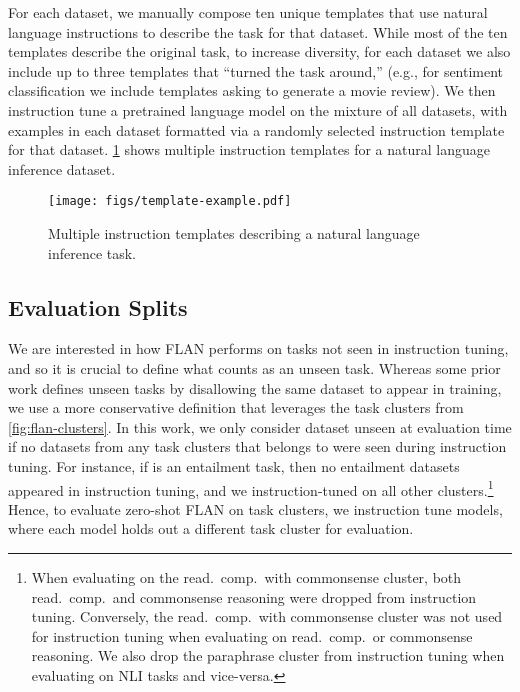 \documentclass{article} \usepackage{iclr2022_conference,times}
\newcommand{\flan}{FLAN}
\begin{document}
For each dataset, we manually compose ten unique templates that use natural language instructions to describe the task for that dataset.
While most of the ten templates describe the original task, to increase diversity, for each dataset we also include up to three templates that ``turned the task around,'' (e.g., for sentiment classification we include templates asking to generate a movie review).
We then instruction tune a pretrained language model on the mixture of all datasets, with examples in each dataset formatted via a randomly selected instruction template for that dataset.
\cref{fig:flan-template-example} shows multiple instruction templates for a natural language inference dataset.
\vspace{-1mm}
\begin{figure}[h]
    \centering
    \texttt{[image: figs/template-example.pdf]}
    \vspace{-3mm}
    \caption{Multiple instruction templates describing a natural language inference task.}
    \vspace{-1mm}
    \label{fig:flan-template-example}
\end{figure}

\subsection{Evaluation Splits}\label{subsec:eval_splits}
We are interested in how \flan{} performs on tasks not seen in instruction tuning, and so it is crucial to define what counts as an unseen task.
Whereas some prior work defines unseen tasks by disallowing the same dataset to appear in training, we use a more conservative definition that leverages the task clusters from \cref{fig:flan-clusters}.
In this work, we only consider dataset  unseen at evaluation time if no datasets from any task clusters that  belongs to were seen during instruction tuning.
For instance, if  is an entailment task, then no entailment datasets appeared in instruction tuning, and we instruction-tuned on all other clusters.\footnote{When evaluating on the read.\ comp.\ with commonsense cluster, both read.\ comp.\ and commonsense reasoning were dropped from instruction tuning.
Conversely, the read.\ comp.\ with commonsense cluster was not used for instruction tuning when evaluating on read.\ comp.\ or commonsense reasoning.
We also drop the paraphrase cluster from instruction tuning when evaluating on NLI tasks and vice-versa.}
Hence, to evaluate zero-shot \flan{} on  task clusters, we instruction tune  models, where each model holds out a different task cluster for evaluation.
\end{document}
